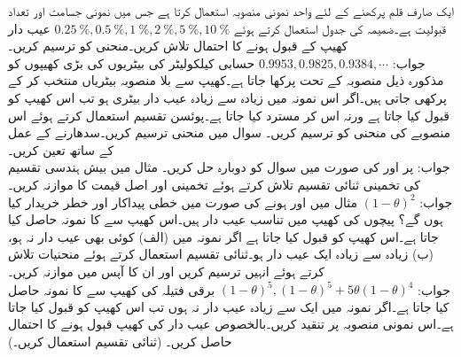 \quad
ایک صارف قلم پرکھنے کے لئے  واحد نمونی منصوبہ استعمال کرتا ہے جس  میں نمونی جسامت  اور  تعداد قبولیت  ہے۔ضمیمہ  کی جدول  استعمال کرتے ہوئے 
$\SI{0.25}{\percent},\SI{0.5}{\percent},\SI{1}{\percent},\SI{2}{\percent},\SI{5}{\percent},\SI{10}{\percent}$
عیب دار کھیپ کے قبول ہونے کا احتمال تلاش کریں۔منحنی  کو ترسیم کریں۔\\
جواب:\quad
$0.9953, 0.9825,0.9384,\cdots$
\quad
حسابی کیلکولیٹر کی بیٹریوں کی بڑی کھیپوں کو مذکورہ ذیل منصوبہ کے تحت پرکھا جاتا ہے۔کھیپ سے بلا منصوبہ  بیٹریاں منتخب کر کے پرکھی جاتی ہیں۔اگر اس نمونہ میں زیادہ سے زیادہ  عیب دار بیٹری ہو تب اس کھیپ کو قبول کیا جاتا ہے ورنہ اس کر مسترد کیا جاتا ہے۔پوئسن تقسیم استعمال کرتے ہوئے اس منصوبے کی  منحنی کو ترسیم کریں۔   
\quad
سوال  میں  منحنی ترسیم کریں۔سدھارنے کے عمل کے ساتھ  تعین کریں۔\\
جواب:\quad
{} پر 
\quad
{} اور  کی صورت میں سوال  کو دوبارہ حل کریں۔
\quad
مثال  میں بیش ہندسی تقسیم کی تخمینی ثنائی تقسیم تلاش کرتے ہوئے تخمینی اور اصل قیمت کا موازنہ کریں۔\\
جواب:\quad
$(1-\theta)^2$
\quad
مثال  میں   اور   ہونے کی صورت میں خطی پیداکار اور خطر خریدار کیا ہوں گے؟
\quad
پیچوں کی کھیپ میں  تناسب عیب دار ہیں۔اس کھیپ سے  کا نمونہ حاصل کیا جاتا ہے۔اس کھیپ کو قبول کیا جاتا ہے اگر نمونہ میں (الف) کوئی بھی عیب دار نہ ہو، (ب) زیادہ سے زیادہ ایک عیب دار ہو۔ثنائی تقسیم استعمال کرتے ہوئے   منحنیات تلاش کرتے ہوئے انہیں ترسیم کریں اور ان کا آپس میں موازنہ کریں۔\\
جواب:\quad
$(1-\theta)^5,(1-\theta)^5+5\theta(1-\theta)^4$
\quad
برقی فتیلہ کی کھیپ سے  کا نمونہ حاصل کیا جاتا ہے۔اگر نمونہ میں ایک سے زیادہ  عیب دار نہ ہوں تب اس کھیپ کو قبول کیا جاتا ہے۔اس نمونی منصوبہ پر تنقید کریں۔بالخصوص   عیب دار کی کھیپ قبول ہونے کا احتمال حاصل کریں۔ (ثنائی تقسیم استعمال کریں۔) 
